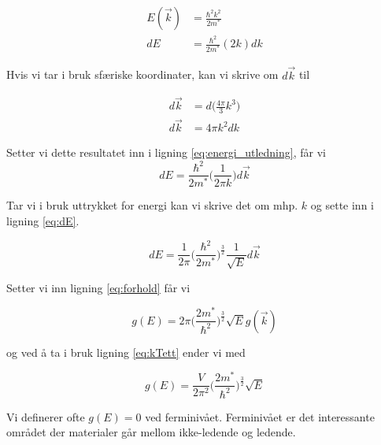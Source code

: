 \begin{equation}
\label{eq:energi_utledning}
    \begin{split}
        E(\Vec{k}) &= \frac{\hbar^2 k^2}{2m^*} \\
        dE &= \frac{\hbar^2}{2m^*}(2k)dk
    \end{split}
\end{equation}

Hvis vi tar i bruk sfæriske koordinater, kan vi skrive om $d\Vec{k}$ til

\begin{equation}
    \begin{split}
        d\Vec{k} &= d \bigg( \frac{4\pi}{3}k^3\bigg) \\
        d\Vec{k} &= 4\pi k^2 dk
    \end{split}
\end{equation}

Setter vi dette resultatet inn i ligning \ref{eq:energi_utledning}, får vi 
\begin{equation}
    \label{eq:dE}
    dE = \frac{\hbar^2}{2m^*} \bigg( \frac{1}{2\pi k}\bigg) d\Vec{k}
\end{equation}

Tar vi i bruk uttrykket for energi kan vi skrive det om mhp. $k$ og sette inn i ligning \ref{eq:dE}.

\begin{equation}
\label{eq:dEFin}
    dE = \frac{1}{2\pi}\bigg(
    \frac{\hbar^2}{2m^*}\bigg)^{\frac{3}{2}}
    \frac{1}{\sqrt{E}} d\Vec{k}
\end{equation}

Setter vi inn ligning \ref{eq:forhold} får vi 

\begin{equation}
    \label{eq:5.39.2}
    g(E) = 2\pi \bigg(
    \frac{2m^*}{\hbar^2} \bigg)^{\frac{3}{2}} \sqrt{E}g(\Vec{k})
\end{equation}

og ved å ta i bruk ligning \ref{eq:kTett} ender vi med

\begin{equation}
    \label{eq:tetthetFunc}
    g(E) = \frac{V}{2\pi^2}\bigg(\frac{2m^*}{\hbar^2}\bigg)^{\frac{3}{2}} \sqrt{E}
\end{equation}

Vi definerer ofte $g(E)=0$ ved ferminivået. Ferminivået er det interessante området der materialer går mellom ikke-ledende og ledende.

